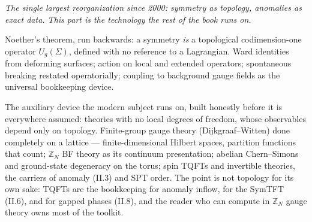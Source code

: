\noin \emph{The single largest reorganization since 2000: symmetry as topology, anomalies as exact data. This part is the technology the rest of the book runs on.}

Noether's theorem, run backwards: a symmetry \emph{is} a topological codimension-one operator $U_g(\Sigma)$, defined with no reference to a Lagrangian. Ward identities from deforming surfaces; action on local and extended operators; spontaneous breaking restated operatorially; coupling to background gauge fields as the universal bookkeeping device.

The auxiliary device the modern subject runs on, built honestly before it is everywhere assumed: theories with no local degrees of freedom, whose observables depend only on topology. Finite-group gauge theory (Dijkgraaf--Witten) done completely on a lattice --- finite-dimensional Hilbert spaces, partition functions that count; $\mathbb{Z}_N$ BF theory as its continuum presentation; abelian Chern--Simons and ground-state degeneracy on the torus; spin TQFTs and invertible theories, the carriers of anomaly (II.3) and SPT order. The point is not topology for its own sake: TQFTs are the bookkeeping for anomaly inflow, for the SymTFT (II.6), and for gapped phases (II.8), and the reader who can compute in $\mathbb{Z}_N$ gauge theory owns most of the toolkit.

